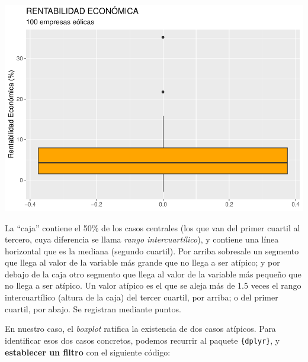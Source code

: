 \documentclass[
]{book}
\newenvironment{Shaded}{\begin{snugshade}}{\end{snugshade}}
\newcommand{\FloatTok}[1]{\textcolor[rgb]{0.00,0.00,0.81}{#1}}
\newcommand{\FunctionTok}[1]{\textcolor[rgb]{0.13,0.29,0.53}{\textbf{#1}}}
\newcommand{\NormalTok}[1]{#1}
\newcommand{\OtherTok}[1]{\textcolor[rgb]{0.56,0.35,0.01}{#1}}
\newcommand{\SpecialCharTok}[1]{\textcolor[rgb]{0.81,0.36,0.00}{\textbf{#1}}}
\let\Oldincludegraphics\includegraphics
\renewcommand{\includegraphics}[2][]{%
  \Oldincludegraphics[#1]{#2}%
}
\begin{document}
\includegraphics{_main_files/figure-latex/unnamed-chunk-164-1.pdf}

La ``caja'' contiene el 50\% de los casos centrales (los que van del primer cuartil al tercero, cuya diferencia se llama \emph{rango intercuartílico}), y contiene una línea horizontal que es la mediana (segundo cuartil). Por arriba sobresale un segmento que llega al valor de la variable más grande que no llega a ser atípico; y por debajo de la caja otro segmento que llega al valor de la variable más pequeño que no llega a ser atípico. Un valor atípico es el que se aleja más de 1.5 veces el rango intercuartílico (altura de la caja) del tercer cuartil, por arriba; o del primer cuartil, por abajo. Se registran mediante puntos.

En nuestro caso, el \emph{boxplot} ratifica la existencia de dos casos atípicos. Para identificar esos dos casos concretos, podemos recurrir al paquete \texttt{\{dplyr\}}, y \textbf{establecer un filtro} con el siguiente código:

\begin{Shaded}
\end{Shaded}
\end{document}
